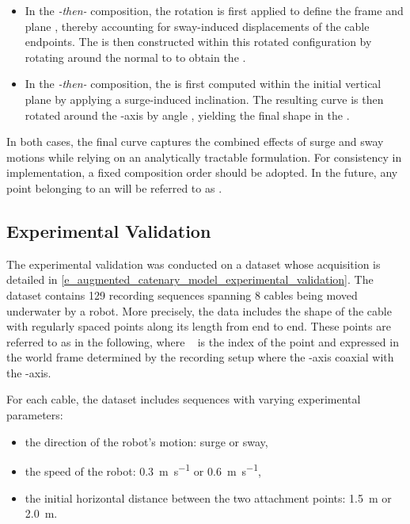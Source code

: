 \begin{itemize}
	\item In the \emph{\scal{\gamma}-then-\scal{\theta}} composition, the \scal{\gamma} rotation is first
	      applied to define the frame \lframe{\gamma} and plane \lplane{\gamma}, thereby accounting for
	      sway-induced displacements of the cable endpoints. The \thetamodel{} is then constructed within
	      this rotated configuration by rotating around the normal to \lplane{\gamma} to obtain the
	      \thetagammamodel{}.
	\item In the \emph{\scal{\theta}-then-\scal{\gamma}} composition, the \thetamodel{} is first computed
	      within the initial vertical plane  by applying a surge-induced inclination. The resulting
	      curve is then rotated around the -axis by angle \scal{\gamma}, yielding the final shape in
	      the \thetagammamodel{}.
\end{itemize}

In both cases, the final curve captures the combined effects of surge and sway motions while
relying on an analytically tractable formulation. For consistency in implementation, a fixed
composition order should be adopted. In the future, any point belonging to an \thetagammamodel{}
will be referred to as .

\subsection{Experimental Validation}
\label{cm_acm_experimental_validation}

The experimental validation was conducted on a dataset whose acquisition is detailed in
\cref{e_augmented_catenary_model_experimental_validation}. The dataset contains \num{129} recording
sequences spanning \num{8} cables being moved underwater by a robot. More precisely, the data
includes the shape of the cable with  regularly spaced points along its length from end to
end. These points are referred to as  in the following, where
~\inzeroton{} is the index of the point and expressed in the world frame 
determined by the recording setup where the -axis coaxial with the -axis.

For each cable, the dataset includes sequences with varying experimental parameters:
\begin{itemize}
	\item the direction of the robot's motion: surge or sway,
	\item the speed of the robot: \qty{0.3}{\meter\per\second} or \qty{0.6}{\meter\per\second},
	\item the initial horizontal distance between the two attachment points: \qty{1.5}{\meter} or
	      \qty{2.0}{\meter}.
\end{itemize}

